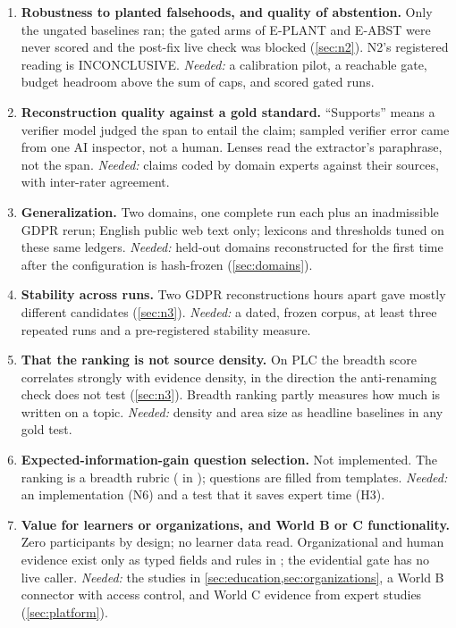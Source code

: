 \begin{enumerate}[label=\textbf{D\arabic*}, leftmargin=2.2em, itemsep=3pt]
\item \textbf{Robustness to planted falsehoods, and quality of abstention.} Only the ungated
  baselines ran; the gated arms of E-PLANT and E-ABST were never scored and the post-fix live check
  was blocked (\cref{sec:n2}). N2's registered reading is INCONCLUSIVE. \emph{Needed:} a
  calibration pilot, a reachable gate, budget headroom above the sum of caps, and scored gated runs.

\item \textbf{Reconstruction quality against a gold standard.} \enquote{Supports} means a verifier
  model judged the span to entail the claim; sampled verifier error came from one AI inspector,
  not a human. Lenses read the extractor's paraphrase, not the span. \emph{Needed:} claims coded by
  domain experts against their sources, with inter-rater agreement.

\item \textbf{Generalization.} Two domains, one complete run each plus an inadmissible GDPR rerun;
  English public web text only; lexicons and thresholds tuned on these same ledgers.
  \emph{Needed:} held-out domains reconstructed for the first time after the configuration is
  hash-frozen (\cref{sec:domains}).

\item \textbf{Stability across runs.} Two GDPR reconstructions hours apart gave mostly different
  candidates (\cref{sec:n3}). \emph{Needed:} a dated, frozen corpus, at least three repeated runs
  and a pre-registered stability measure.

\item \textbf{That the ranking is not source density.} On PLC the breadth score correlates strongly
  with evidence density, in the direction the anti-renaming check does not test (\cref{sec:n3}).
  \evhyp{} Breadth ranking partly measures how much is written on a topic. \emph{Needed:} density
  and area size as headline baselines in any gold test.

\item \textbf{Expected-information-gain question selection.} Not implemented. The ranking is a
  breadth rubric ( in ); questions are
  filled from templates. \emph{Needed:} an implementation (N6) and a test that it saves expert time
  (H3).

\item \textbf{Value for learners or organizations, and World B or C functionality.} Zero
  participants by design; no learner data read. Organizational and human evidence exist only as
  typed fields and rules in ; the evidential gate has no live
  caller. \emph{Needed:} the studies in \cref{sec:education,sec:organizations}, a World B connector
  with access control, and World C evidence from expert studies (\cref{sec:platform}).

\end{enumerate}

